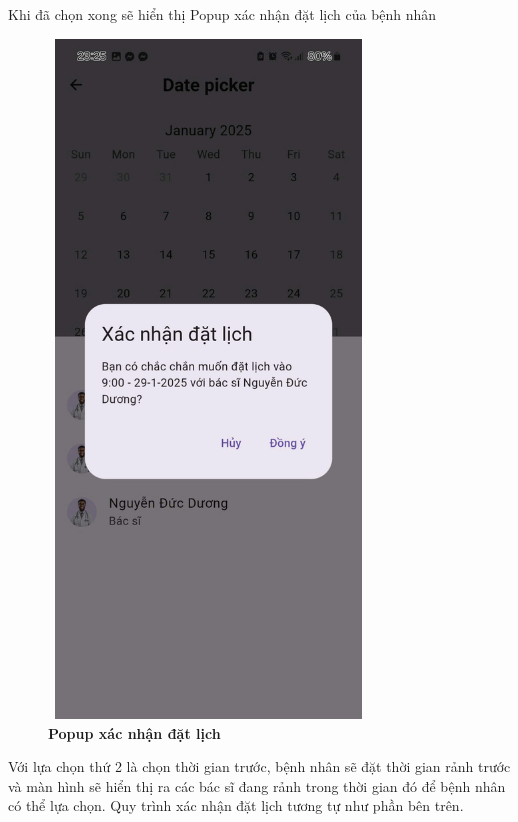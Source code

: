 Khi đã chọn xong sẽ hiển thị Popup xác nhận đặt lịch của bệnh nhân
\begin{figure}[H]
	\centering
	\includegraphics[width=8.5cm,height=18cm]{Images/AppUI/firmPicker.jpg}
	\caption[Popup xác nhận đặt lịch]{\bfseries \fontsize{12pt}{0pt}\selectfont Popup xác nhận đặt lịch}
	\label{TimePickWithDoctor}
\end{figure}

	Với lựa chọn thứ 2 là chọn thời gian trước, bệnh nhân sẽ đặt thời gian rảnh trước và màn hình sẽ hiển thị ra các bác sĩ đang rảnh trong thời gian đó để bệnh nhân có thể lựa chọn. Quy trình xác nhận đặt lịch tương tự như phần bên trên.

